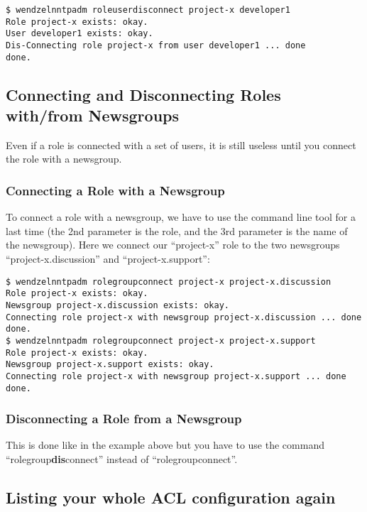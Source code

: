\begin{verbatim}
$ wendzelnntpadm roleuserdisconnect project-x developer1
Role project-x exists: okay.
User developer1 exists: okay.
Dis-Connecting role project-x from user developer1 ... done
done.
\end{verbatim}

\subsection{Connecting and Disconnecting Roles with/from Newsgroups}

Even if a role is connected with a set of users, it is still useless until you connect the role with a newsgroup.

\subsubsection{Connecting a Role with a Newsgroup}

To connect a role with a newsgroup, we have to use the command line tool for a last time (the 2nd parameter is the role, and the 3rd parameter is the name of the newsgroup). Here we connect our ``project-x'' role to the two newsgroups ``project-x.discussion'' and ``project-x.support'':

\begin{verbatim}
$ wendzelnntpadm rolegroupconnect project-x project-x.discussion
Role project-x exists: okay.
Newsgroup project-x.discussion exists: okay.
Connecting role project-x with newsgroup project-x.discussion ... done
done.
$ wendzelnntpadm rolegroupconnect project-x project-x.support
Role project-x exists: okay.
Newsgroup project-x.support exists: okay.
Connecting role project-x with newsgroup project-x.support ... done
done.
\end{verbatim}

\subsubsection{Disconnecting a Role from a Newsgroup}

This is done like in the example above but you have to use the command ``rolegroup\textbf{dis}connect'' instead of ``rolegroupconnect''.

\subsection{Listing your whole ACL configuration again}

